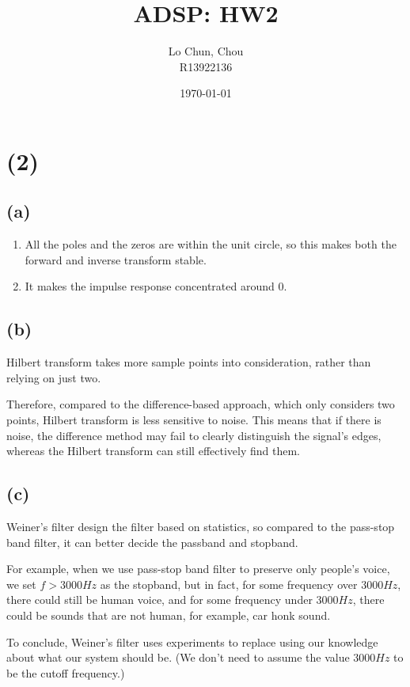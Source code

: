 \documentclass{article}
\title{ADSP: HW2}
\author{Lo Chun, Chou \\ R13922136}
\date\today
\begin{document}
\setlength{\parindent}{0pt}
\maketitle 

\section*{(2)}

\subsection*{(a)}

\begin{enumerate}
    \item All the poles and the zeros are within the unit circle, 
    so this makes both the forward and inverse transform stable.  
    \item It makes the impulse response concentrated around $0$.
\end{enumerate}

\subsection*{(b)} 

Hilbert transform takes more sample points into consideration, rather than relying on just two.
\bigskip

Therefore, compared to the difference-based approach, which only considers two points, Hilbert transform is less sensitive to noise.
This means that if there is noise, the difference method may fail to clearly distinguish the signal’s edges,
whereas the Hilbert transform can still effectively find them.

\subsection*{(c)}

Weiner's filter design the filter based on statistics, so compared to the pass-stop band filter,
it can better decide the passband and stopband.
\bigskip

For example, when we use pass-stop band filter to preserve only people's voice,
we set $f > 3000 Hz$ as the stopband, but in fact, 
for some frequency over $3000 Hz$, there could still be human voice, 
and for some frequency under $3000 Hz$, there could be sounds that are not human, for example, car honk sound.
\bigskip

To conclude, Weiner's filter uses experiments to replace using our knowledge about what our system should be. 
(We don't need to assume the value $3000 Hz$ to be the cutoff frequency.)
\end{document}
